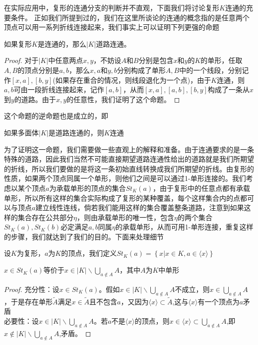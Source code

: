 在实际应用中，复形的连通分支的判断并不直观，下面我们将讨论复形$K$连通的充要条件。
正如我们所提到过的，我们在这里所谈论的连通的概念指的是任意两个顶点可以用一系列折线连接起来，我们事实上可以证明下列更强的命题
\begin{proposition}\label{pro767}
如果复形$K$是连通的，那么$|K|$道路连通。
\end{proposition}
\begin{proof}
对于$|K|$中任意两点$x,y$，不妨设$A$和$B$分别是包含$x$和$y$的$K$的单形，任取$A,B$的顶点分别是$a,b$，那么$x,a$和$y,b$分别构成了单形$A,B$中的一个线段，分别记作$[x,a],[b,y]$(如果存在重合的情况，则线段退化为一个点)，由于$K$连通，则$a,b$可由一段折线连接起来，记作$[a,b]$，从而$[x,a],[a,b],[b,y]$构成了一条从$x$到$y$的道路。由于$x,y$的任意性，我们证明了这个命题。
\end{proof}
这个命题的逆命题也是成立的，即
\begin{proposition}\label{pro774}
如果多面体$|K|$是道路连通的，则$K$连通
\end{proposition}
为了证明这一命题，我们需要做一些直观上的解释和准备。由于连通要求的是一条特殊的道路，因此我们当然不可能直接期望道路连通性给出的道路就是我们所期望的折线，所以我们要做的是将这一条初始直线转换成我们所期望的折线。由复形的性质，如果两个顶点同属一个单形，则他们之间是可以通过1-单形连接的。我们考虑以某个顶点$a$为承载单形的顶点的集合$St_{K}(a)$，由于复形中的任意点都有承载单形，所以所有这样的集合实际构成了复形的某种覆盖，每个这样集合内的点都可以与顶点$a$建立线性连线，倘若我们能用这样的集合覆盖整条道路，注意到如果这样的集合存在公共部分$\eta$，则由承载单形的唯一性，包含$\eta$的两个集合$St_{K}(a),St_{K}(b)$必定满足$a,b$同属$\eta$的承载单形，从而可用1-单形连接，重复这样的步骤，我们就达到了我们的目的。下面来处理细节
\begin{definition}
设$K$为复形，$a$为$K$的顶点，我们定义$St_{K}(a)=\left\{x|x\in K,a\in\langle x\rangle\right\}$
\end{definition}
\begin{proposition}
$x\in St_{K}(a)$等价于$x\in|K|\backslash\bigcup\limits_{a\notin A}A$，其中$A$为$K$中单形
\end{proposition}
\begin{proof}
充分性：设$x\in St_{K}(a)$。假如$x\in|K|\backslash\bigcup\limits_{a\notin A}A$不成立，则$x\in\bigcup\limits_{a\notin A}A$，于是存在单形$\tilde{A}$满足$x\in \tilde{A}$且不包含$a$，又因为$\langle x\rangle\subset \tilde{A}$,这与$\langle x\rangle$有一个顶点为$a$矛盾\\
必要性：设$x\in|K|\backslash\bigcup\limits_{a\notin A}A$。若$a$不是$\langle x\rangle$的顶点，则$x\in\langle x\rangle\subset \bigcup\limits_{a\notin A}A$,即$x\notin|K|\backslash\bigcup\limits_{a\notin A}A$,矛盾。
\end{proof}
